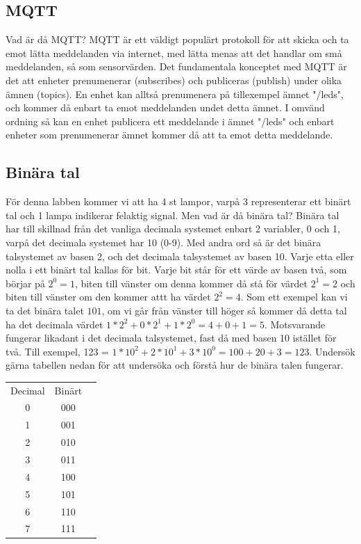 \documentclass{article}
\begin{document}
\subsection{MQTT}
Vad är då MQTT? MQTT är ett väldigt populärt protokoll för att skicka och ta emot lätta meddelanden via internet, med lätta menas att det handlar om små meddelanden, så som sensorvärden. Det fundamentala konceptet med MQTT är det att enheter prenumenerar (subscribes) och publiceras (publish) under olika ämnen (topics). En enhet kan alltså prenumenera på tillexempel ämnet "/leds", och kommer då enbart ta emot meddelanden undet detta ämnet. I omvänd ordning så kan en enhet publicera ett meddelande i ämnet "/leds" och enbart enheter som prenumenerar ämnet kommer då att ta emot detta meddelande.

\subsection{Binära tal}
För denna labben kommer vi att ha 4 st lampor, varpå 3 representerar ett binärt tal och 1 lampa indikerar felaktig signal. Men vad är då binära tal? Binära tal har till skillnad från det vanliga decimala systemet enbart 2 variabler, 0 och 1, varpå det decimala systemet har 10 (0-9). Med andra ord så är det binära talsystemet av basen 2, och det decimala talsystemet av basen 10. Varje etta eller nolla i ett binärt tal kallas för bit. Varje bit står för ett värde av basen två, som börjar på $2^{0} = 1$, biten till vänster om denna kommer då stå för värdet $2^{1} = 2$ och biten till vänster om den kommer attt ha värdet $2^{2} = 4$. Som ett exempel kan vi ta det binära talet $101$, om vi går från vänster till höger så kommer då detta tal ha det decimala värdet $1*2^{2}+0*2^{1}+1*2^{0} =4+0+1=5$. Motsvarande fungerar likadant i det decimala talsystemet, fast då med basen 10 istället för två. Till exempel, 123 = $1*10^{2}+2*10^{1}+3*10^{0} = 100+20+3=123$.
Undersök gärna tabellen nedan för att undersöka och förstå hur de binära talen fungerar.

\begin{center}
\begin{tabular}{ |c|c|c| } 
 \hline
 Decimal & Binärt \\ 
    0 & 000 \\ 
    1 & 001 \\ 
    2 & 010 \\ 
    3 & 011 \\ 
    4 & 100 \\ 
    5 & 101 \\ 
    6 & 110 \\ 
    7 & 111 \\ 
 \hline
\end{tabular}
\end{center}
\end{document}
